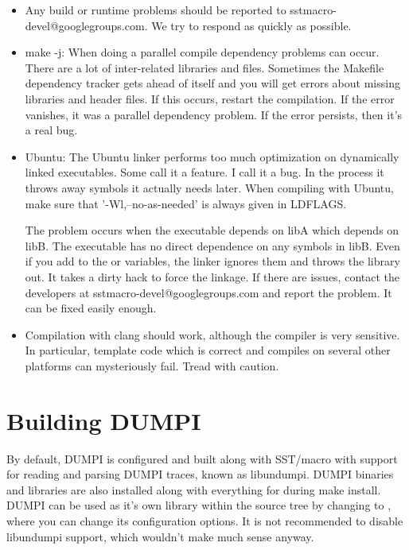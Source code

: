 \begin{itemize}
\item Any build or runtime problems should be reported to sstmacro-devel@googlegroups.com.  We try to respond as quickly as possible.
\item make -j: When doing a parallel compile dependency problems can occur.  
There are a lot of inter-related libraries and files.  
Sometimes the Makefile dependency tracker gets ahead of itself and you will get errors about missing libraries and header files.
If this occurs, restart the compilation.  If the error vanishes, it was a parallel dependency problem.
If the error persists, then it's a real bug.

\item Ubuntu: The Ubuntu linker performs too much optimization on dynamically linked executables.
Some call it a feature.  I call it a bug.
In the process it throws away symbols it actually needs later.
When compiling with Ubuntu, make sure that '-Wl,--no-as-needed' is always given in LDFLAGS.

The problem occurs when the executable depends on libA which depends on libB.
The executable has no direct dependence on any symbols in libB.
Even if you add  to the  or  variables,
the linker ignores them and throws the library out.
It takes a dirty hack to force the linkage.
If there are issues, contact the developers at sstmacro-devel@googlegroups.com and report the problem. 
It can be fixed easily enough.

\item Compilation with clang should work, although the compiler is very sensitive.  
In particular, template code which is correct and compiles on several other platforms can mysteriously fail.  Tread with caution.
\end{itemize}

\section{Building DUMPI}
\label{sec:building:dumpi}

By default, DUMPI is configured and built along with SST/macro with support for reading and parsing DUMPI traces, known as libundumpi.  
DUMPI binaries and libraries are also installed along with everything for \sstmacro during make install.   
DUMPI can be used as it's own library within the \sstmacro source tree by changing to , 
where you can change its configuration options.  
It is not recommended to disable libundumpi support, which wouldn't make much sense anyway. 


